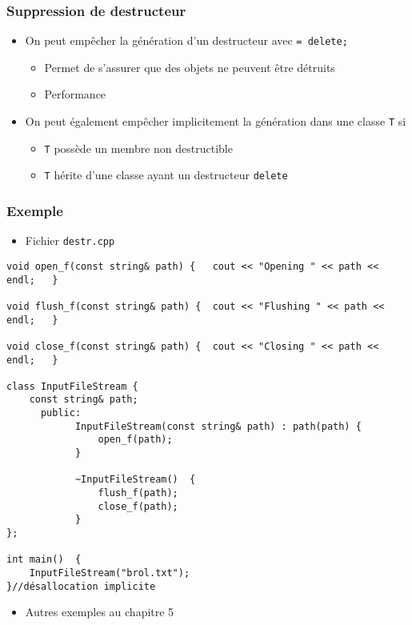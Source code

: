 \begin{frame}
\frametitle{Suppression de destructeur}
\begin{itemize}[<+->]
\item On peut empêcher la génération d'un destructeur avec \lstinline|= delete;|
	\begin{itemize}
	\item Permet de s'assurer que des objets ne peuvent être détruits
	\item Performance
	\end{itemize}
\item On peut également empêcher implicitement la génération dans une classe \texttt{T} si
	\begin{itemize}
	\item \texttt{T} possède un membre non destructible
	\item \texttt{T} hérite d'une classe ayant un destructeur \lstinline|delete|
	\end{itemize}
\end{itemize}
\end{frame}

\begin{frame}[containsverbatim]
\frametitle{Exemple}
\begin{itemize}
\item Fichier \texttt{destr.cpp}
\end{itemize}
\begin{lstlisting}
void open_f(const string& path) {	cout << "Opening " << path << endl;   }

void flush_f(const string& path) {	cout << "Flushing " << path << endl;   }

void close_f(const string& path) {	cout << "Closing " << path << endl;   }

class InputFileStream {
    const string& path;    
      public:
            InputFileStream(const string& path) : path(path) {
                open_f(path);
            }
    
            ~InputFileStream()	{                
                flush_f(path);
                close_f(path);
            }
};

int main()	{
    InputFileStream("brol.txt");
}//désallocation implicite
\end{lstlisting}
\begin{itemize}
\item Autres exemples au chapitre 5
\end{itemize}
\end{frame}

